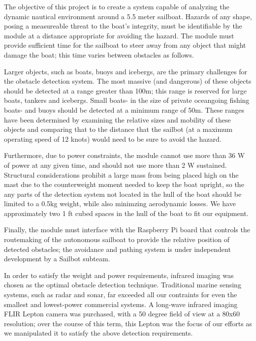 The objective of this project is to create a system capable of analyzing the dynamic nautical environment around a 5.5 meter sailboat. Hazards of any shape, posing a measureable threat to the boat's integrity, must be identifiable by the module at a distance appropriate for avoiding the hazard. The module must provide sufficient time for the sailboat to steer away from any object that might damage the boat; this time varies between obstacles as follows.

Larger objects, such as boats, buoys and icebergs, are the primary challenges for the obstacle detection system. The most massive (and dangerous) of these objects should be detected at a range greater than 100m; this range is reserved for large boats, tankers and icebergs. Small boats- in the size of private oceangoing fishing boats- and buoys should be detected at a minimum range of 50m. These ranges have been determined by examining the relative sizes and mobility of these objects and comparing that to the distance that the sailbot (at a maximum operating speed of 12 knots) would need to be sure to avoid the hazard.

Furthermore, due to power constraints, the module cannot use more than 36 W of power at any given time, and should not use more than 2 W sustained. Structural considerations prohibit a large mass from being placed high on the mast due to the counterweight moment needed to keep the boat upright, so the any parts of the detection system not located in the hull of the boat should be limited to a 0.5kg weight, while also minimzing aerodynamic losses. We have approximately two 1 ft cubed spaces in the hull of the boat to fit our equipment. 

Finally, the module must interface with the Raspberry Pi board that controls the routemaking of the autonomous sailboat to provide the relative position of detected obstacles; the avoidance and pathing system is under independent development by a Sailbot subteam.

In order to satisfy the weight and power requirements, infrared imaging was chosen as the optimal obstacle detection technique. Traditional marine sensing systems, such as radar and sonar, far exceeded all our contraints for even the smallest and lowest-power commercial systems. A long-wave infrared imaging FLIR Lepton camera was purchased, with a 50 degree field of view at a 80x60 resolution; over the course of this term, this Lepton was the focus of our efforts as we manipulated it to satisfy the above detection requirements.

